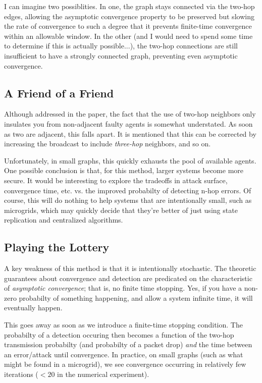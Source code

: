 \documentclass[11pt]{article}
\begin{document}
I can imagine two possiblities. In one, the graph stays connected via the
two-hop edges, allowing the asymptotic convergence property to be preserved but
slowing the rate of convergence to such a degree that it prevents finite-time
convergence within an allowable window. In the other (and I would need to spend
some time to determine if this is actually possible...), the two-hop connections
are still insufficient to have a strongly connected graph, preventing
even asymptotic convergence.

\subsection*{A Friend of a Friend}
Although addressed in the paper, the fact  that the use of two-hop neighbors
only insulates you from non-adjacent faulty agents is somewhat understated. As
soon as two are adjacent, this falls apart. It is mentioned that this can be
corrected by increasing the broadcast to include \textit{three-hop} neighbors,
and so on.

Unfortunately, in small graphs, this quickly exhausts the pool of available
agents.  One possible conclusion is that, for this method, larger systems become
more secure.  It would be interesting to explore the tradeoffs in attack
surface, convergence time, etc.  vs. the improved probabilty of detecting n-hop
errors.  Of course, this will do nothing to help systems that are intentionally
small, such as microgrids, which may quickly decide that they're better of just
using state replication and centralized algorithms.

\subsection*{Playing the Lottery}
A key weakness of this method is that it is intentionally stochastic. The
theoretic guarantees about convergence and detection are predicated on the
characteristic of \textit{asymptotic convergence}; that is, no finite time
stopping. Yes, if you have a non-zero probabilty of something happening, and
allow a system infinite time, it will eventually happen.

This goes away as soon as we introduce a finite-time stopping condition.
The probabilty of a detection occuring then becomes a function of the
two-hop transmission probabilty (and probabilty of a packet drop) \textit{and}
the time between an error/attack until convergence. In practice, on small graphs
(such as what might be found in a microgrid), we see convergence occurring in
relatively few iterations ($<20$ in the numerical experiment).
\end{document}
